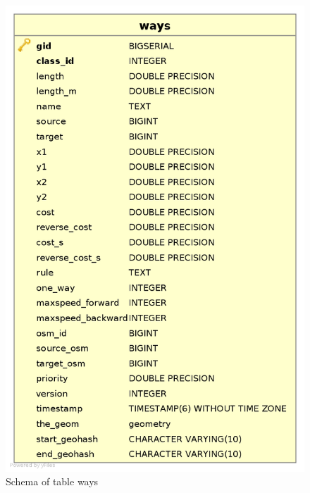 \begin{figure}
\includegraphics[scale=.35]{ways.png}
\caption{Schema of table ways}
\label{fg:ways}
\end{figure}

